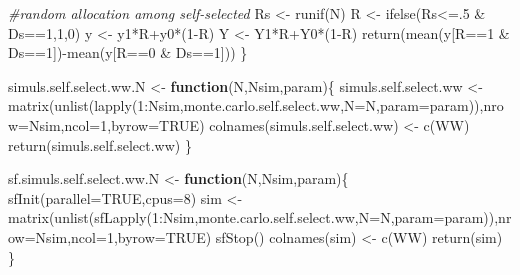 \documentclass[
]{book}
\newenvironment{Shaded}{\begin{snugshade}}{\end{snugshade}}
\newcommand{\AttributeTok}[1]{\textcolor[rgb]{0.77,0.63,0.00}{#1}}
\newcommand{\CommentTok}[1]{\textcolor[rgb]{0.56,0.35,0.01}{\textit{#1}}}
\newcommand{\ConstantTok}[1]{\textcolor[rgb]{0.00,0.00,0.00}{#1}}
\newcommand{\ControlFlowTok}[1]{\textcolor[rgb]{0.13,0.29,0.53}{\textbf{#1}}}
\newcommand{\DecValTok}[1]{\textcolor[rgb]{0.00,0.00,0.81}{#1}}
\newcommand{\FunctionTok}[1]{\textcolor[rgb]{0.00,0.00,0.00}{#1}}
\newcommand{\NormalTok}[1]{#1}
\newcommand{\OtherTok}[1]{\textcolor[rgb]{0.56,0.35,0.01}{#1}}
\newcommand{\SpecialCharTok}[1]{\textcolor[rgb]{0.00,0.00,0.00}{#1}}
\newcommand{\StringTok}[1]{\textcolor[rgb]{0.31,0.60,0.02}{#1}}
\theoremstyle{definition}
\theoremstyle{definition}
\theoremstyle{definition}
\theoremstyle{definition}
\theoremstyle{remark}
\begin{document}
\begin{Shaded}
\begin{Highlighting}[]
  \CommentTok{\#random allocation among self{-}selected}
\NormalTok{  Rs }\OtherTok{\textless{}{-}} \FunctionTok{runif}\NormalTok{(N)}
\NormalTok{  R }\OtherTok{\textless{}{-}} \FunctionTok{ifelse}\NormalTok{(Rs}\SpecialCharTok{\textless{}=}\NormalTok{.}\DecValTok{5} \SpecialCharTok{\&}\NormalTok{ Ds}\SpecialCharTok{==}\DecValTok{1}\NormalTok{,}\DecValTok{1}\NormalTok{,}\DecValTok{0}\NormalTok{)}
\NormalTok{  y }\OtherTok{\textless{}{-}}\NormalTok{ y1}\SpecialCharTok{*}\NormalTok{R}\SpecialCharTok{+}\NormalTok{y0}\SpecialCharTok{*}\NormalTok{(}\DecValTok{1}\SpecialCharTok{{-}}\NormalTok{R)}
\NormalTok{  Y }\OtherTok{\textless{}{-}}\NormalTok{ Y1}\SpecialCharTok{*}\NormalTok{R}\SpecialCharTok{+}\NormalTok{Y0}\SpecialCharTok{*}\NormalTok{(}\DecValTok{1}\SpecialCharTok{{-}}\NormalTok{R)}
  \FunctionTok{return}\NormalTok{(}\FunctionTok{mean}\NormalTok{(y[R}\SpecialCharTok{==}\DecValTok{1} \SpecialCharTok{\&}\NormalTok{ Ds}\SpecialCharTok{==}\DecValTok{1}\NormalTok{])}\SpecialCharTok{{-}}\FunctionTok{mean}\NormalTok{(y[R}\SpecialCharTok{==}\DecValTok{0} \SpecialCharTok{\&}\NormalTok{ Ds}\SpecialCharTok{==}\DecValTok{1}\NormalTok{]))}
\NormalTok{\}}

\NormalTok{simuls.self.select.ww.N }\OtherTok{\textless{}{-}} \ControlFlowTok{function}\NormalTok{(N,Nsim,param)\{}
\NormalTok{  simuls.self.select.ww }\OtherTok{\textless{}{-}} \FunctionTok{matrix}\NormalTok{(}\FunctionTok{unlist}\NormalTok{(}\FunctionTok{lapply}\NormalTok{(}\DecValTok{1}\SpecialCharTok{:}\NormalTok{Nsim,monte.carlo.self.select.ww,}\AttributeTok{N=}\NormalTok{N,}\AttributeTok{param=}\NormalTok{param)),}\AttributeTok{nrow=}\NormalTok{Nsim,}\AttributeTok{ncol=}\DecValTok{1}\NormalTok{,}\AttributeTok{byrow=}\ConstantTok{TRUE}\NormalTok{)}
  \FunctionTok{colnames}\NormalTok{(simuls.self.select.ww) }\OtherTok{\textless{}{-}} \FunctionTok{c}\NormalTok{(}\StringTok{\textquotesingle{}WW\textquotesingle{}}\NormalTok{)}
  \FunctionTok{return}\NormalTok{(simuls.self.select.ww)}
\NormalTok{\}}

\NormalTok{sf.simuls.self.select.ww.N }\OtherTok{\textless{}{-}} \ControlFlowTok{function}\NormalTok{(N,Nsim,param)\{}
  \FunctionTok{sfInit}\NormalTok{(}\AttributeTok{parallel=}\ConstantTok{TRUE}\NormalTok{,}\AttributeTok{cpus=}\DecValTok{8}\NormalTok{)}
\NormalTok{  sim }\OtherTok{\textless{}{-}} \FunctionTok{matrix}\NormalTok{(}\FunctionTok{unlist}\NormalTok{(}\FunctionTok{sfLapply}\NormalTok{(}\DecValTok{1}\SpecialCharTok{:}\NormalTok{Nsim,monte.carlo.self.select.ww,}\AttributeTok{N=}\NormalTok{N,}\AttributeTok{param=}\NormalTok{param)),}\AttributeTok{nrow=}\NormalTok{Nsim,}\AttributeTok{ncol=}\DecValTok{1}\NormalTok{,}\AttributeTok{byrow=}\ConstantTok{TRUE}\NormalTok{)}
  \FunctionTok{sfStop}\NormalTok{()}
  \FunctionTok{colnames}\NormalTok{(sim) }\OtherTok{\textless{}{-}} \FunctionTok{c}\NormalTok{(}\StringTok{\textquotesingle{}WW\textquotesingle{}}\NormalTok{)}
  \FunctionTok{return}\NormalTok{(sim)}
\NormalTok{\}}


\end{Highlighting}
\end{Shaded}
\end{document}
